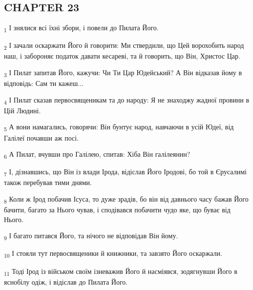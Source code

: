 \subsection{CHAPTER 23}
\begin{tcolorbox}
\textsubscript{1} І знялися всі їхні збори, і повели до Пилата Його.
\end{tcolorbox}
\begin{tcolorbox}
\textsubscript{2} І зачали оскаржати Його й говорити: Ми ствердили, що Цей ворохобить народ наш, і забороняє податок давати кесареві, та й говорить, що Він, Христос Цар.
\end{tcolorbox}
\begin{tcolorbox}
\textsubscript{3} І Пилат запитав Його, кажучи: Чи Ти Цар Юдейський? А Він відказав йому в відповідь: Сам ти кажеш...
\end{tcolorbox}
\begin{tcolorbox}
\textsubscript{4} І Пилат сказав первосвященикам та до народу: Я не знаходжу жадної провини в Цій Людині.
\end{tcolorbox}
\begin{tcolorbox}
\textsubscript{5} А вони намагались, говорячи: Він бунтує народ, навчаючи в усій Юдеї, від Галілеї почавши аж посі.
\end{tcolorbox}
\begin{tcolorbox}
\textsubscript{6} А Пилат, вчувши про Галілею, спитав: Хіба Він галілеянин?
\end{tcolorbox}
\begin{tcolorbox}
\textsubscript{7} І, дізнавшись, що Він із влади Ірода, відіслав Його Іродові, бо той в Єрусалимі також перебував тими днями.
\end{tcolorbox}
\begin{tcolorbox}
\textsubscript{8} Коли ж Ірод побачив Ісуса, то дуже зрадів, бо він від давнього часу бажав Його бачити, багато за Нього чував, і сподівався побачити чудо яке, що буває від Нього.
\end{tcolorbox}
\begin{tcolorbox}
\textsubscript{9} І багато питався Його, та нічого не відповідав Він йому.
\end{tcolorbox}
\begin{tcolorbox}
\textsubscript{10} І стояли тут первосвященики й книжники, та завзято Його оскаржали.
\end{tcolorbox}
\begin{tcolorbox}
\textsubscript{11} Тоді Ірод із військом своїм ізневажив Його й насміявся, зодягнувши Його в яснобілу одіж, і відіслав до Пилата Його.
\end{tcolorbox}
